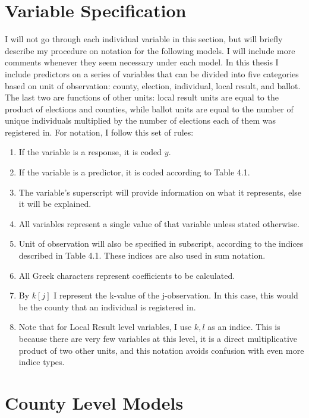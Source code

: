 \documentclass[12pt,twoside]{reedthesis}
\providecommand{\tightlist}{%
  \setlength{\itemsep}{0pt}\setlength{\parskip}{0pt}}
\begin{document}
  \section{Variable Specification}\label{variable-specification}
  
  I will not go through each individual variable in this section, but will
  briefly describe my procedure on notation for the following models. I
  will include more comments whenever they seem necessary under each
  model. In this thesis I include predictors on a series of variables that
  can be divided into five categories based on unit of observation:
  county, election, individual, local result, and ballot. The last two are
  functions of other units: local result units are equal to the product of
  elections and counties, while ballot units are equal to the number of
  unique individuals multiplied by the number of elections each of them
  was registered in. For notation, I follow this set of rules:
  
  \begin{enumerate}
  \def\labelenumi{\arabic{enumi}.}
  \tightlist
  \item
    If the variable is a response, it is coded \(y\).
  \item
    If the variable is a predictor, it is coded according to Table 4.1.
  \item
    The variable's superscript will provide information on what it
    represents, else it will be explained.
  \item
    All variables represent a single value of that variable unless stated
    otherwise.
  \item
    Unit of observation will also be specified in subscript, according to
    the indices described in Table 4.1. These indices are also used in sum
    notation.
  \item
    All Greek characters represent coefficients to be calculated.
  \item
    By \(k[j]\) I represent the k-value of the j-observation. In this
    case, this would be the county that an individual is registered in.
  \item
    Note that for Local Result level variables, I use \(k,l\) as an
    indice. This is because there are very few variables at this level, it
    is a direct multiplicative product of two other units, and this
    notation avoids confusion with even more indice types.
  \end{enumerate}
  
  \section{County Level Models}\label{county-level-models}
  
\end{document}
